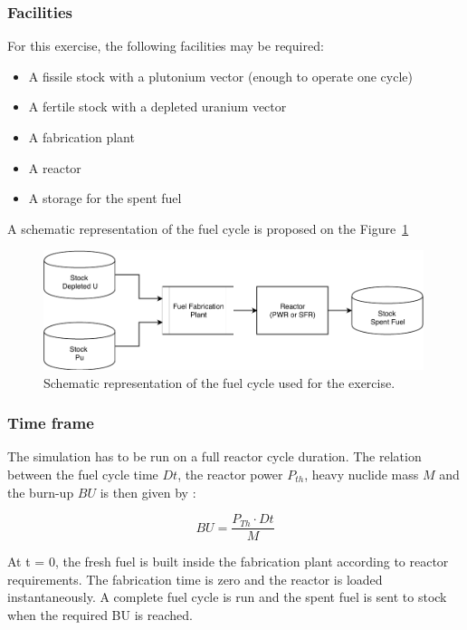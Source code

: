 \documentclass[review]{elsarticle}
\begin{document}
\subsubsection{Facilities}

For this exercise, the following facilities may be required: 

\begin{itemize}
    \item A fissile stock with a plutonium vector (enough to operate one cycle)
    \item A fertile stock with a depleted uranium vector
    \item A fabrication plant
    \item A reactor
    \item A storage for the spent fuel
\end{itemize}

A schematic representation of the fuel cycle is proposed on the Figure~\ref{fig:Scenario}

\begin{figure}
    \centering
    \includegraphics[width=0.99\textwidth]{FIG/FuelCycleDiagram.pdf}
    \caption{Schematic representation of the fuel cycle used for the exercise.}
    \label{fig:Scenario}
\end{figure}

\subsubsection{Time frame}

The simulation has to be run on a full reactor cycle duration. The relation between the fuel cycle time $Dt$, the reactor power $P_{th}$, heavy nuclide mass $M$ and the burn-up $BU$ is then given by : 

\begin{equation}
BU = \frac{P_{Th} \cdot Dt}{M}
\end{equation}

At t = 0, the fresh fuel is built inside the fabrication plant according to reactor requirements. The fabrication time is zero and the reactor is loaded instantaneously. A complete fuel cycle is run and the spent fuel is sent to stock when the required BU is reached.
\end{document}
